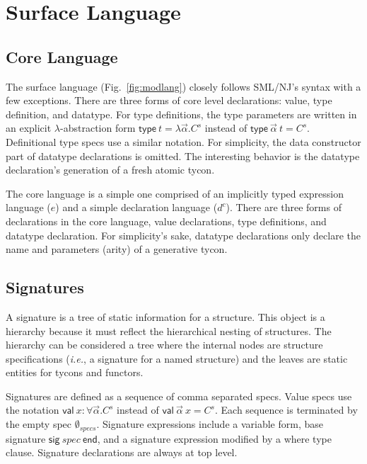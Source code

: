 \chapter{Surface Language}\label{ch:surfacelang}


\section{Core Language}

The surface language (Fig.~\ref{fig:modlang}) closely follows SML/NJ's syntax with a few exceptions. There are three forms of core level declarations: value, type definition, and datatype. For type definitions, the type parameters are written in an explicit $\lambda$-abstraction form $\mathsf{type}~t = \lambda\vec{\alpha}.C^s$ instead of $\mathsf{type}~\vec{\alpha}~t=C^s$. Definitional type specs use a similar notation. For simplicity, the data constructor part of datatype declarations is omitted. The interesting behavior is the datatype declaration's generation of a fresh atomic tycon.

The core language is a simple one comprised of an implicitly typed expression language ($e$) and a simple declaration language ($d^c$). There are three forms of declarations in the core language, value declarations, type definitions, and datatype declaration. For simplicity's sake, datatype declarations only declare the name and parameters (arity) of a generative tycon. 

\section{Signatures} 
A signature is a tree of static information for a structure. This object is a hierarchy because it must reflect the hierarchical nesting of structures. The hierarchy can be considered a tree where the internal nodes are structure specifications (\emph{i.e.}, a signature for a named structure) and the leaves are static entities for tycons and functors. 

Signatures are defined as a sequence of comma separated specs. Value specs use the notation $\mathsf{val}~x:\forall\vec{\alpha}.C^s$ instead of $\mathsf{val}~\vec{\alpha}~x=C^s$. Each sequence is terminated by the empty spec $\emptyset_{specs}$. Signature expressions include a variable form, base signature $\mathsf{sig}~spec~\mathsf{end}$, and a signature expression modified by a where type clause. Signature declarations are always at top level.

